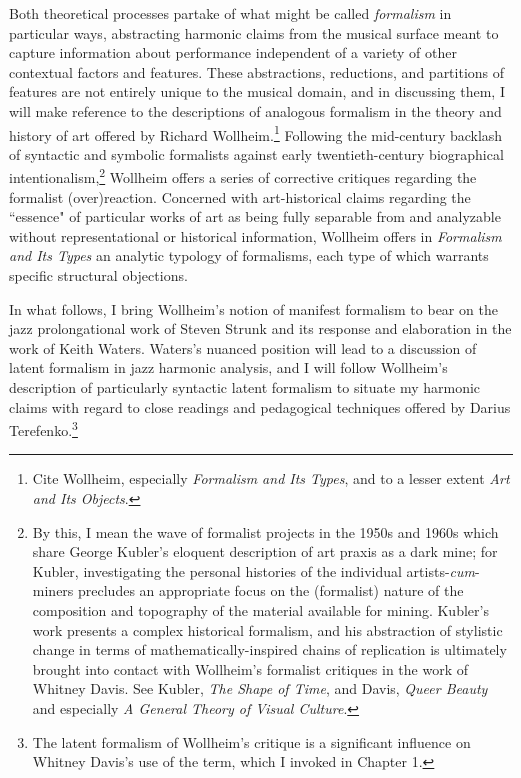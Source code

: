 Both theoretical processes partake of what might be called \emph{formalism} in particular ways, abstracting harmonic claims from the musical surface meant to capture information about performance independent of a variety of other contextual factors and features.  These abstractions, reductions, and partitions of features are not entirely unique to the musical domain, and in discussing them, I will make reference to the descriptions of analogous formalism in the theory and history of art offered by Richard Wollheim.\footnote{Cite Wollheim, especially \emph{Formalism and Its Types}, and to a lesser extent \emph{Art and Its Objects}.}  Following the mid-century backlash of syntactic and symbolic formalists against early twentieth-century biographical intentionalism,\footnote{By this, I mean the wave of formalist projects in the 1950s and 1960s which share George Kubler's eloquent description of art praxis as a dark mine; for Kubler, investigating the personal histories of the individual artists-\emph{cum}-miners precludes an appropriate focus on the (formalist) nature of the composition and topography of the material available for mining.  Kubler's work presents a complex historical formalism, and his abstraction of stylistic change in terms of mathematically-inspired chains of replication is ultimately brought into contact with Wollheim's formalist critiques in the work of Whitney Davis.  See Kubler, \emph{The Shape of Time}, and Davis, \emph{Queer Beauty} and especially \emph{A General Theory of Visual Culture}.}  Wollheim offers a series of corrective critiques regarding the formalist (over)reaction.  Concerned with art-historical claims regarding the ``essence" of particular works of art as being fully separable from and analyzable without representational or historical information, Wollheim offers in \emph{Formalism and Its Types} an analytic typology of formalisms, each type of which warrants specific structural objections.

In what follows, I bring Wollheim's notion of manifest formalism to bear on the jazz prolongational work of Steven Strunk and its response and elaboration in the work of Keith Waters.  Waters's nuanced position will lead to a discussion of latent formalism in jazz harmonic analysis, and I will follow Wollheim's description of particularly syntactic latent formalism to situate my harmonic claims with regard to close readings and pedagogical techniques offered by Darius Terefenko.\footnote{The latent formalism of Wollheim's critique is a significant influence on Whitney Davis's use of the term, which I invoked in Chapter 1.}

